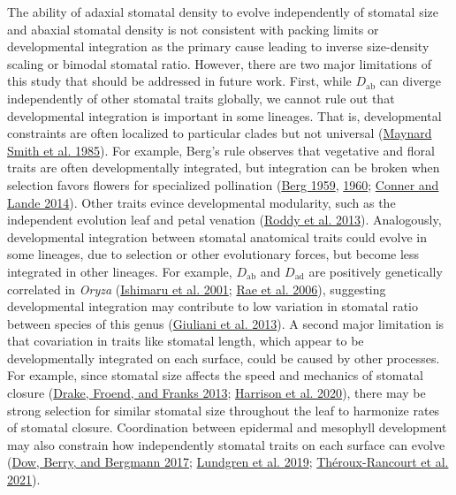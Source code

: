 \documentclass[
  12pt,
]{article}
\begin{document}
The ability of adaxial stomatal density to evolve independently of stomatal size and abaxial stomatal density is not consistent with packing limits or developmental integration as the primary cause leading to inverse size-density scaling or bimodal stomatal ratio. However, there are two major limitations of this study that should be addressed in future work. First, while \(D_\text{ab}\) can diverge independently of other stomatal traits globally, we cannot rule out that developmental integration is important in some lineages. That is, developmental constraints are often localized to particular clades but not universal (\protect\hyperlink{ref-maynard_smith_developmental_1985}{Maynard Smith et al. 1985}). For example, Berg's rule observes that vegetative and floral traits are often developmentally integrated, but integration can be broken when selection favors flowers for specialized pollination (\protect\hyperlink{ref-berg_general_1959}{Berg 1959}, \protect\hyperlink{ref-berg_ecological_1960}{1960}; \protect\hyperlink{ref-conner_raissa_2014}{Conner and Lande 2014}). Other traits evince developmental modularity, such as the independent evolution leaf and petal venation (\protect\hyperlink{ref-roddy_uncorrelated_2013}{Roddy et al. 2013}). Analogously, developmental integration between stomatal anatomical traits could evolve in some lineages, due to selection or other evolutionary forces, but become less integrated in other lineages. For example, \(D_\text{ab}\) and \(D_\text{ad}\) are positively genetically correlated in \emph{Oryza} (\protect\hyperlink{ref-ishimaru_identification_2001}{Ishimaru et al. 2001}; \protect\hyperlink{ref-rae_elucidating_2006}{Rae et al. 2006}), suggesting developmental integration may contribute to low variation in stomatal ratio between species of this genus (\protect\hyperlink{ref-giuliani_coordination_2013}{Giuliani et al. 2013}). A second major limitation is that covariation in traits like stomatal length, which appear to be developmentally integrated on each surface, could be caused by other processes. For example, since stomatal size affects the speed and mechanics of stomatal closure (\protect\hyperlink{ref-drake_smaller_2013}{Drake, Froend, and Franks 2013}; \protect\hyperlink{ref-harrison_influence_2020}{Harrison et al. 2020}), there may be strong selection for similar stomatal size throughout the leaf to harmonize rates of stomatal closure. Coordination between epidermal and mesophyll development may also constrain how independently stomatal traits on each surface can evolve (\protect\hyperlink{ref-dow_disruption_2017}{Dow, Berry, and Bergmann 2017}; \protect\hyperlink{ref-lundgren_mesophyll_2019}{Lundgren et al. 2019}; \protect\hyperlink{ref-theroux-rancourt_maximum_2021}{Théroux-Rancourt et al. 2021}).
\end{document}

